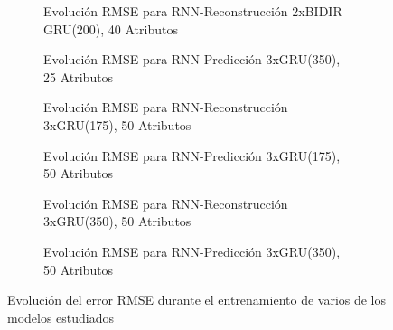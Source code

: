 \begin{figure}[h!t]
  \centering
  \begin{subfigure}[b]{0.48\textwidth}
      \centering
      \caption{\footnotesize \label{fig:rnnTrain:recon:bidir:40}Evolución RMSE para RNN-Reconstrucción 2xBIDIR GRU(200), 40 Atributos}
  \end{subfigure}
\hfill
  \begin{subfigure}[b]{0.48\textwidth}
      \centering
      \caption{\footnotesize \label{fig:rnnTrain:predict:25}Evolución RMSE para RNN-Predicción 3xGRU(350), 25 Atributos}
  \end{subfigure}
  

  \begin{subfigure}[b]{0.48\textwidth}
      \centering
      \caption{\footnotesize \label{fig:rnnTrain:recon:175}Evolución RMSE para RNN-Reconstrucción 3xGRU(175), 50 Atributos}
  \end{subfigure}
\hfill
  \begin{subfigure}[b]{0.48\textwidth}
      \centering
      \caption{\footnotesize \label{fig:rnnTrain:predict:175}Evolución RMSE para RNN-Predicción 3xGRU(175), 50 Atributos}
  \end{subfigure}


  \begin{subfigure}[b]{0.49\textwidth}
      \centering
      \caption{\footnotesize \label{fig:rnnTrain:recon:50}Evolución RMSE para RNN-Reconstrucción 3xGRU(350), 50 Atributos}
  \end{subfigure}
  \hfill
  \begin{subfigure}[b]{0.49\textwidth}
      \centering
      \caption{\footnotesize \label{fig:modelo:rnnTrain:predict:50}Evolución RMSE para RNN-Predicción 3xGRU(350), 50 Atributos}
  \end{subfigure}
  \caption{\label{fig:rnn:training} Evolución del error RMSE durante el entrenamiento de varios de los modelos estudiados}
\end{figure}

